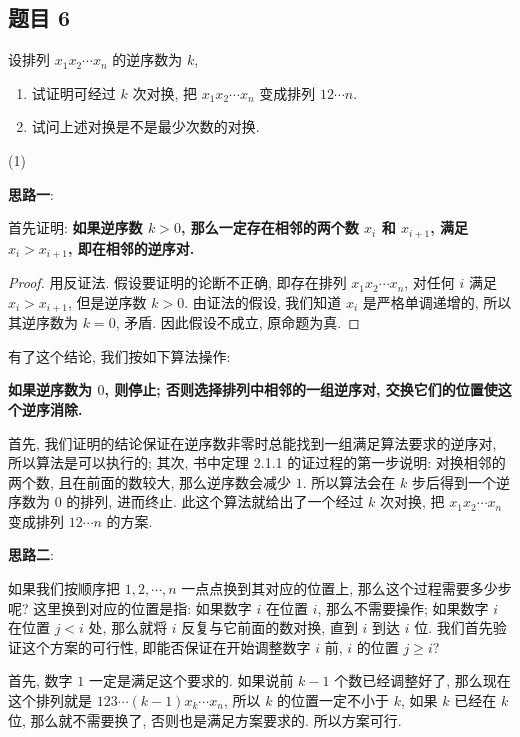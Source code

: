 \subsection*{题目 6}
\begin{problem*}
设排列 $x_1 x_2 \cdots x_n$ 的逆序数为 $k$,
\begin{enumerate}
    \item 试证明可经过 $k$ 次对换, 把 $x_1 x_2 \cdots x_n$ 变成排列 $12 \cdots n$.
    \item 试问上述对换是不是最少次数的对换.
\end{enumerate}
\end{problem*}
\begin{solution}
(1) 

\textbf{思路一}: 

首先证明: \textbf{如果逆序数 $k > 0$, 那么一定存在相邻的两个数 $x_i$ 和 $x_{i + 1}$, 满足 $x_i > x_{i + 1}$, 即在相邻的逆序对.}
\begin{proof}
    用反证法. 假设要证明的论断不正确, 即存在排列 $x_1 x_2 \cdots x_n$, 对任何 $i$ 满足 $x_i > x_{i + 1}$, 但是逆序数 $k > 0$. 由证法的假设, 我们知道 $x_i$ 是严格单调递增的, 所以其逆序数为 $k = 0$, 矛盾. 因此假设不成立, 原命题为真.
\end{proof}
    
有了这个结论, 我们按如下算法操作: 

    \textbf{如果逆序数为 $0$, 则停止; 否则选择排列中相邻的一组逆序对, 交换它们的位置使这个逆序消除.}
    
首先, 我们证明的结论保证在逆序数非零时总能找到一组满足算法要求的逆序对, 所以算法是可以执行的; 其次, 书中定理 2.1.1 的证过程的第一步说明: 对换相邻的两个数, 且在前面的数较大, 那么逆序数会减少 $1$. 所以算法会在 $k$ 步后得到一个逆序数为 $0$ 的排列, 进而终止. 此这个算法就给出了一个经过 $k$ 次对换, 把 $x_1 x_2 \cdots x_n$ 变成排列 $12 \cdots n$ 的方案.
    
\textbf{思路二}:
    
如果我们按顺序把 $1, 2, \cdots, n$ 一点点换到其对应的位置上, 那么这个过程需要多少步呢? 这里换到对应的位置是指: 如果数字 $i$ 在位置 $i$, 那么不需要操作; 如果数字 $i$ 在位置 $j < i$ 处, 那么就将 $i$ 反复与它前面的数对换, 直到 $i$ 到达 $i$ 位. 我们首先验证这个方案的可行性, 即能否保证在开始调整数字 $i$ 前, $i$ 的位置 $j \geqslant i$?

首先, 数字 $1$ 一定是满足这个要求的. 如果说前 $k - 1$ 个数已经调整好了, 那么现在这个排列就是 $123 \cdots (k - 1) x_k \cdots x_n$, 所以 $k$ 的位置一定不小于 $k$, 如果 $k$ 已经在 $k$ 位, 那么就不需要换了, 否则也是满足方案要求的. 所以方案可行.


\end{solution}
